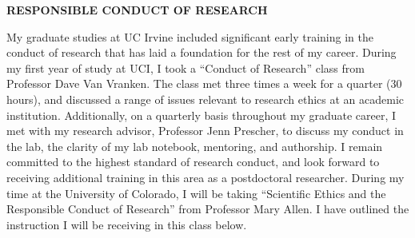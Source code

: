 

\begin{center}
\bf RESPONSIBLE CONDUCT OF RESEARCH
\end{center}

My graduate studies at UC Irvine included significant early training in the conduct of research that has laid a foundation for the rest of my career. During my first year of study at UCI, I took a ``Conduct of Research'' class from Professor Dave Van Vranken. The class met three times a week for a quarter (30 hours), and discussed a range of issues relevant to research ethics at an academic institution. Additionally, on a quarterly basis throughout my graduate career, I met with my research advisor, Professor Jenn Prescher, to discuss my conduct in the lab, the clarity of my lab notebook, mentoring, and authorship. I remain committed to the highest standard of research conduct, and look forward to receiving additional training in this area as a postdoctoral researcher. During my time at the University of Colorado, I will be taking ``Scientific Ethics and the Responsible Conduct of Research'' from Professor Mary Allen. I have outlined the instruction I will be receiving in this class below.

